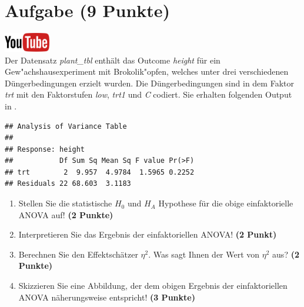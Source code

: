 \documentclass[a4paper, 9pt]{scrartcl}\usepackage[]{graphicx}\usepackage[]{xcolor}
\makeatletter
\newenvironment{kframe}{%
 \def\at@end@of@kframe{}%
 \ifinner\ifhmode%
  \def\at@end@of@kframe{\end{minipage}}%
  \begin{minipage}{\columnwidth}%
 \fi\fi%
 \def\FrameCommand##1{\hskip\@totalleftmargin \hskip-\fboxsep
 \colorbox{shadecolor}{##1}\hskip-\fboxsep
     \hskip-\linewidth \hskip-\@totalleftmargin \hskip\columnwidth}%
 \MakeFramed {\advance\hsize-\width
   \@totalleftmargin\z@ \linewidth\hsize
   \@setminipage}}%
 {\par\unskip\endMakeFramed%
 \at@end@of@kframe}
\newenvironment{knitrout}{}{} %
\makeatother
\begin{document}
 
\clearpage

\section{Aufgabe \hfill (9 Punkte)}

\hfill\href{https://youtu.be/d4CFR2MKX7I}{\includegraphics[width =
  2cm]{img/youtube}}\\[1Ex]




Der Datensatz \textit{plant\_tbl} enth{\"a}lt das Outcome \textit{height} f{\"u}r ein Gew{"a}chshausexperiment mit 
Brokolik{"o}pfen, welches unter drei 
verschiedenen D{\"u}ngerbedingungen erzielt wurden. Die D{\"u}ngerbedingungen sind in dem Faktor
\textit{trt} mit den Faktorstufen \textit{low},  \textit{trt1} und
 \textit{C} codiert. Sie erhalten folgenden Output in \Rlogo.

\begin{knitrout}
\color{fgcolor}\begin{kframe}
\begin{verbatim}
## Analysis of Variance Table
## 
## Response: height
##           Df Sum Sq Mean Sq F value Pr(>F)
## trt        2  9.957  4.9784  1.5965 0.2252
## Residuals 22 68.603  3.1183
\end{verbatim}
\end{kframe}
\end{knitrout}

\begin{enumerate}
\item Stellen Sie die statistische $H_0$ und $H_A$ Hypothese f{\"u}r die obige
  einfaktorielle ANOVA auf! \textbf{(2 Punkte)}
\item Interpretieren Sie das Ergebnis der einfaktoriellen ANOVA! \textbf{(2 Punkt)} 
\item Berechnen Sie den Effektsch{\"a}tzer $\eta^2$. Was sagt Ihnen der Wert von
  $\eta^2$ aus? \textbf{(2 Punkte)}
\item Skizzieren Sie eine Abbildung, der dem obigen Ergebnis der
  einfaktoriellen ANOVA n{\"a}herungsweise entspricht! \textbf{(3 Punkte)}
\end{enumerate}
\end{document}
